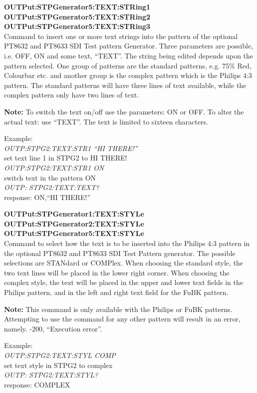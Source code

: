 \textbf{OUTPut:STPGenerator5:TEXT:STRing1}\\
\textbf{OUTPut:STPGenerator5:TEXT:STRing2}\\
\textbf{OUTPut:STPGenerator5:TEXT:STRing3}\\
Command to insert one or more text strings into the pattern of the optional PT8632 and PT8633 SDI Test pattern Generator. Three parameters are possible, i.e. OFF, ON and some text, ``TEXT''. The string being edited depends upon the pattern selected. One group of patterns are the standard patterns, e.g. 75\% Red, Colourbar etc. and another group is the complex pattern which is the Philips 4:3 pattern. The standard patterns will have three lines of text available, while the complex pattern only have two lines of text.

\textbf{Note:} To switch the text on/off use the parameters: ON or OFF. To alter the actual text: use ``TEXT''. The text is limited to sixteen characters. %

Example:\\
\textit{OUTP:STPG2:TEXT:STR1 ``HI THERE!''}\\
set text line 1 in STPG2 to HI THERE!\\
\textit{OUTP:STPG2:TEXT:STR1 ON}\\
switch text in the pattern ON\\
\textit{OUTP: STPG2:TEXT:TEXT?}\\
response: ON,``HI THERE!''

\textbf{OUTPut:STPGenerator1:TEXT:STYLe}\\
\textbf{OUTPut:STPGenerator2:TEXT:STYLe}\\
\textbf{OUTPut:STPGenerator5:TEXT:STYLe}\\
Command to select how the text is to be inserted into the Philips 4:3 pattern in the optional PT8632 and PT8633 SDI Test Pattern generator. The possible selections are STANdard or COMPlex. When choosing the standard style, the two text lines will be placed in the lower right corner. When choosing the complex style, the text will be placed in the upper and lower text fields in the Philips pattern, and in the left and right text field for the FuBK pattern.

\textbf{Note:} This command is only available with the Philips or FuBK patterns. Attempting to use the command for any other pattern will result in an error, namely. -200, ``Execution error''.

Example:\\
\textit{OUTP:STPG2:TEXT:STYL COMP}\\
set text style in STPG2 to complex\\
\textit{OUTP: STPG2:TEXT:STYL?}\\
response: COMPLEX

